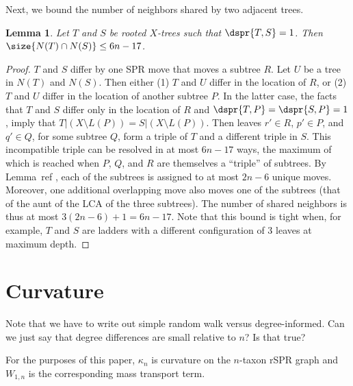 \documentclass{amsart}
\newtheorem{lemma}[theorem]{Lemma}
\begin{document}
Next, we bound the number of neighbors shared by two adjacent trees.

\begin{lemma}
	\label{lem:shared_neighbors}
Let $T$ and $S$ be rooted $X$-trees such that $\dspr{T,S} = 1$.
Then $\size{N(T) \cap N(S)} \le 6n - 17$.
\end{lemma}

\begin{proof}
	$T$ and $S$ differ by one SPR move that moves a subtree $R$.
	Let $U$ be a tree in $N(T)$ and $N(S)$.
	Then either (1) $T$ and $U$ differ in the location of $R$, or (2) $T$ and $U$ differ in the location of another subtree $P$.
	In the latter case, the facts that $T$ and $S$ differ only in the location of $R$ and $\dspr{T,P} = \dspr{S,P} = 1$, imply that $T|(X \setminus L(P)) = S|(X \setminus L(P))$.
	Then leaves $r' \in R$, $p' \in P$, and $q' \in Q$, for some subtree $Q$, form a triple of $T$ and a different triple in $S$.
	This incompatible triple can be resolved in at most $6n - 17$ ways, the maximum of which is reached when $P$, $Q$, and $R$ are themselves a ``triple'' of subtrees.
	By Lemma~ref{ }, each of the subtrees is assigned to at most $2n-6$ unique moves.
	Moreover, one additional overlapping move also moves one of the subtrees (that of the aunt of the LCA of the three subtrees).
	The number of shared neighbors is thus at most $3(2n-6) + 1 = 6n-17$.
	Note that this bound is tight when, for example, $T$ and $S$ are ladders with a different configuration of 3 leaves at maximum depth.
\end{proof}





\section{Curvature}
Note that we have to write out simple random walk versus degree-informed.
Can we just say that degree differences are small relative to $n$? Is that true?

For the purposes of this paper, $\kappa_n$ is curvature on the $n$-taxon rSPR graph and $W_{1,n}$ is the corresponding mass transport term.
\end{document}
